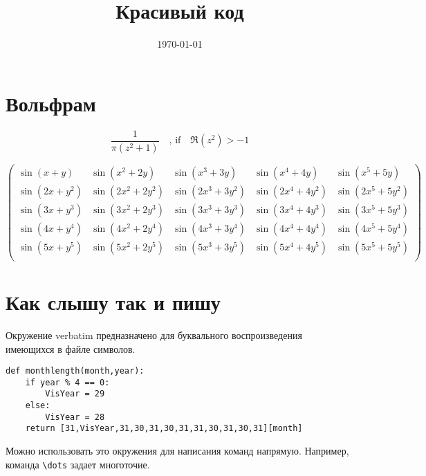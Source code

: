 \documentclass[12pt, a4paper]{article}
\title{Красивый код}
\date{\today}
\begin{document}

\maketitle

\section{Вольфрам} 


$$
\frac{1}{\pi  \left(z^2+1\right)} \quad \text{,  if} \quad \Re\left(z^2\right)>-1
$$


\[
\left(
\begin{array}{ccccc}
\sin (x+y) & \sin \left(x^2+2 y\right) & \sin \left(x^3+3
y\right) & \sin \left(x^4+4 y\right) & \sin \left(x^5+5
y\right) \\
\sin \left(2 x+y^2\right) & \sin \left(2 x^2+2 y^2\right) & \sin
\left(2 x^3+3 y^2\right) & \sin \left(2 x^4+4 y^2\right) &
\sin \left(2 x^5+5 y^2\right) \\
\sin \left(3 x+y^3\right) & \sin \left(3 x^2+2 y^3\right) & \sin
\left(3 x^3+3 y^3\right) & \sin \left(3 x^4+4 y^3\right) &
\sin \left(3 x^5+5 y^3\right) \\
\sin \left(4 x+y^4\right) & \sin \left(4 x^2+2 y^4\right) & \sin
\left(4 x^3+3 y^4\right) & \sin \left(4 x^4+4 y^4\right) &
\sin \left(4 x^5+5 y^4\right) \\
\sin \left(5 x+y^5\right) & \sin \left(5 x^2+2 y^5\right) & \sin
\left(5 x^3+3 y^5\right) & \sin \left(5 x^4+4 y^5\right) &
\sin \left(5 x^5+5 y^5\right) \\
\end{array}
\right)
\]


\section{Как слышу так и пишу}

Окружение verbatim предназначено для буквального воспроизведения имеющихся в файле символов.

\begin{verbatim}
def monthlength(month,year):
    if year % 4 == 0:
        VisYear = 29
    else:
        VisYear = 28
    return [31,VisYear,31,30,31,30,31,31,30,31,30,31][month]
\end{verbatim}

Можно использовать это окружения для написания команд напрямую. Например, команда \verb|\dots| задает многоточие.
\end{document}
